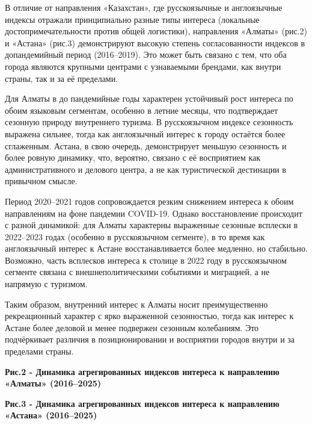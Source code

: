\begin{multicols}{2}
В отличие от направления «Казахстан», где русскоязычные и англоязычные
индексы отражали принципиально разные типы интереса (локальные
достопримечательности против общей логистики), направления «Алматы»
(рис.2) и «Астана» (рис.3) демонстрируют высокую степень
согласованности индексов в допандемийный период (2016--2019). Это может
быть связано с тем, что оба города являются крупными центрами с
узнаваемыми брендами, как внутри страны, так и за её пределами.

Для Алматы в до пандемийные годы характерен устойчивый рост интереса по
обоим языковым сегментам, особенно в летние месяцы, что подтверждает
сезонную природу внутреннего туризма. В русскоязычном индексе сезонность
выражена сильнее, тогда как англоязычный интерес к городу остаётся более
сглаженным. Астана, в свою очередь, демонстрирует меньшую сезонность и
более ровную динамику, что, вероятно, связано с её восприятием как
административного и делового центра, а не как туристической дестинации в
привычном смысле.

Период 2020--2021 годов сопровождается резким снижением интереса к обоим
направлениям на фоне пандемии COVID-19. Однако восстановление происходит
с разной динамикой: для Алматы характерны выраженные сезонные всплески в
2022--2023 годах (особенно в русскоязычном сегменте), в то время как
англоязычный интерес к Астане восстанавливается более медленно, но
стабильно. Возможно, часть всплесков интереса к столице в 2022 году в
русскоязычном сегменте связана с внешнеполитическими событиями и
миграцией, а не напрямую с туризмом.

Таким образом, внутренний интерес к Алматы носит преимущественно
рекреационный характер с ярко выраженной сезонностью, тогда как интерес
к Астане более деловой и менее подвержен сезонным колебаниям. Это
подчёркивает различия в позиционировании и восприятии городов внутри и
за пределами страны.
\end{multicols}

{\bfseries Рис.2 - Динамика агрегированных индексов интереса к направлению «Алматы» (2016--2025)}

{\bfseries Рис.3 - Динамика агрегированных индексов интереса к направлению «Астана» (2016--2025)}

